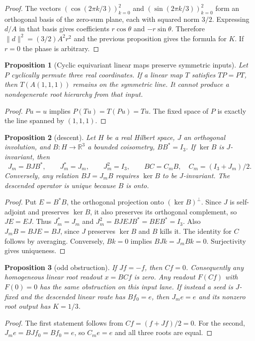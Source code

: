 \documentclass[11pt,a4paper]{article}
\newtheorem{proposition}{Proposition}[section]
\begin{document}
\begin{proof}
The vectors $(\cos(2\pi k/3))_{k=0}^2$ and
$(\sin(2\pi k/3))_{k=0}^2$ form an orthogonal basis of the
zero-sum plane, each with squared norm $3/2$. Expressing $d/A$
in that basis gives coefficients $r\cos\theta$ and
$-r\sin\theta$. Therefore $\|d\|^2=(3/2)A^2r^2$ and the
previous proposition gives the formula for $K$. If $r=0$ the
phase is arbitrary.
\end{proof}
\begin{proposition}[Cyclic equivariant linear maps preserve symmetric inputs]
\label{v480:koide-equivariant-obstruction}
Let $P$ cyclically permute three real coordinates. If a linear map
$T$ satisfies $TP=PT$, then $T(A(1,1,1))$ remains on the symmetric
line. It cannot produce a nondegenerate root hierarchy from that input.
\end{proposition}
\begin{proof}
$Pu=u$ implies $P(Tu)=T(Pu)=Tu$. The fixed space of $P$ is
exactly the line spanned by $(1,1,1)$.
\end{proof}
\begin{proposition}[descent]
\label{v480:hc-mass-descent}
Let $H$ be a real Hilbert space, $J$ an orthogonal involution, and
$B:H\to\mathbb R^3$ a bounded coisometry, $BB^*=I_3$. If
$\ker B$ is $J$-invariant, then
\[
 J_m=BJB^*,\qquad J_m^*=J_m,\qquad J_m^2=I_3,
 \qquad BC=C_mB,\quad C_m=(I_3+J_m)/2.
\]
Conversely, any relation $BJ=J_mB$ requires $\ker B$ to be
$J$-invariant. The descended operator is unique because $B$ is onto.
\end{proposition}
\begin{proof}
Put $E=B^*B$, the orthogonal projection onto $(\ker B)^\perp$.
Since $J$ is self-adjoint and preserves $\ker B$, it also preserves
its orthogonal complement, so $JE=EJ$. Thus $J_m^*=J_m$ and
$J_m^2=BJEJB^*=BEB^*=I_3$. Also
$J_mB=BJE=BJ$, since $J$ preserves $\ker B$ and $B$ kills it.
The identity for $C$ follows by averaging. Conversely,
$Bk=0$ implies $BJk=J_mBk=0$. Surjectivity gives uniqueness.
\end{proof}
\begin{proposition}[odd obstruction]
\label{v480:hc-mass-odd-obstruction}
If $Jf=-f$, then $Cf=0$. Consequently any homogeneous linear
root readout $x=BCf$ is zero. Any readout $F(Cf)$ with $F(0)=0$
has the same obstruction on this input lane. If instead a seed is
$J$-fixed and the descended linear route has $Bf_0=e$, then
$J_me=e$ and its nonzero root output has $K=1/3$.
\end{proposition}
\begin{proof}
The first statement follows from $Cf=(f+Jf)/2=0$.
For the second, $J_me=BJf_0=Bf_0=e$, so $C_me=e$ and
all three roots are equal.
\end{proof}
\end{document}
